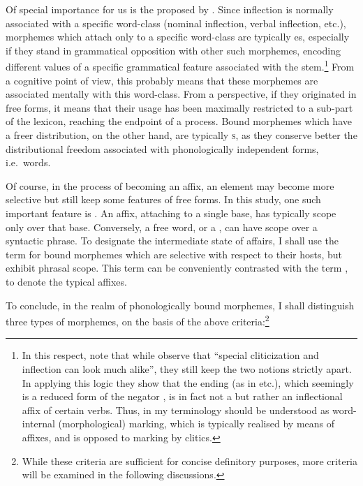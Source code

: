 Of special importance for us is the  proposed by \citet{ZwickyPullum}. Since inflection is normally associated with a specific word-class (nominal inflection, verbal inflection, etc.), morphemes which attach only to a specific word-class are typically es, especially if they stand in grammatical opposition with other such morphemes, encoding different values of a specific grammatical feature associated with the stem.\footnote{In this respect, note that while \citet[511]{ZwickyPullum} observe that \enquote{special cliticization and inflection can look much alike}, they still keep the two notions strictly apart. In applying this logic they show that the  ending  (as in  etc.), which seemingly is a reduced  form of the  negator , is in fact not a  but rather an inflectional affix of certain  verbs. Thus,   in my terminology should be understood as word-internal (morphological) marking, which is typically realised by means of affixes, and is opposed to marking by clitics.} 
  From a cognitive point of view, this probably means that these morphemes are associated mentally with this word-class. From a  perspective, if they originated in free forms, it means that their usage has been maximally restricted to a sub-part of the lexicon, reaching the endpoint of a  process. Bound morphemes which have a freer distribution, on the other hand, are typically \textsc{s}, as they conserve better the distributional freedom associated with phonologically independent forms, i.e.\ words. 

Of course, in the process of becoming an affix, an element may become more selective but still keep some features of free forms. In this study, one such important feature is . An affix, attaching to a single base, has typically scope only over that base. Conversely, a free word, or a , can have  scope over a syntactic phrase. To designate the intermediate state of affairs, I shall use the term  for bound morphemes which are selective with respect to their hosts, but exhibit phrasal scope. This term can be conveniently contrasted with the term , to denote the typical affixes. 

To conclude, in the realm of phonologically bound morphemes, I shall distinguish three types of morphemes, on the basis of the above criteria:\footnote{While these criteria are sufficient for concise definitory purposes, more criteria will be examined in the following discussions.}  


